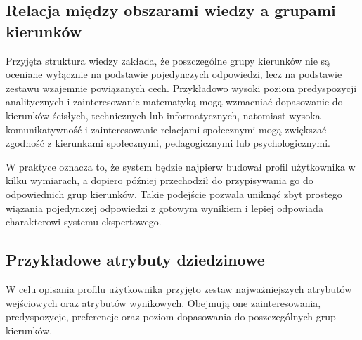 \documentclass[12pt,a4paper,oneside]{article}
\begin{document}
\subsection{Relacja między obszarami wiedzy a grupami kierunków}

Przyjęta struktura wiedzy zakłada, że poszczególne grupy kierunków nie są oceniane wyłącznie na podstawie pojedynczych odpowiedzi, lecz na podstawie zestawu wzajemnie powiązanych cech. Przykładowo wysoki poziom predyspozycji analitycznych i zainteresowanie matematyką mogą wzmacniać dopasowanie do kierunków ścisłych, technicznych lub informatycznych, natomiast wysoka komunikatywność i zainteresowanie relacjami społecznymi mogą zwiększać zgodność z kierunkami społecznymi, pedagogicznymi lub psychologicznymi.

W praktyce oznacza to, że system będzie najpierw budował profil użytkownika w kilku wymiarach, a dopiero później przechodził do przypisywania go do odpowiednich grup kierunków. Takie podejście pozwala uniknąć zbyt prostego wiązania pojedynczej odpowiedzi z gotowym wynikiem i lepiej odpowiada charakterowi systemu ekspertowego.

\subsection{Przykładowe atrybuty dziedzinowe}

W celu opisania profilu użytkownika przyjęto zestaw najważniejszych atrybutów wejściowych oraz atrybutów wynikowych. Obejmują one zainteresowania, predyspozycje, preferencje oraz poziom dopasowania do poszczególnych grup kierunków.
\vspace{25px}
\renewcommand{\arraystretch}{1.2}
\end{document}

